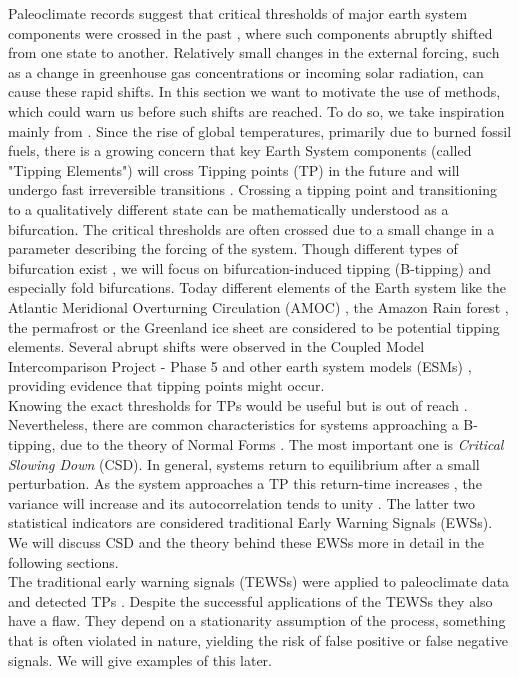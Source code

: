 \documentclass[%
thesis=student,%
coverpage=false,%
titlepage=false,%
headmarks=true, %
english,%
font=libertine, %
math=newpxtx, %
BCOR=5mm,%
coverBCOR=11mm%
]{tumbook}
\begin{document}
Paleoclimate records suggest that critical thresholds of major earth system components were crossed in the past \cite{Brovkin:2021}, where such components abruptly shifted from one state to another. Relatively small changes in the external forcing, such as a change in greenhouse gas concentrations or incoming solar radiation, can cause these rapid shifts. In this section we want to motivate the use of methods, which could warn us before such shifts are reached. To do so, we take inspiration mainly from \cite{Clarke:2023}.
Since the rise of global temperatures, primarily due to burned fossil fuels, there is a growing concern \cite{Lenton:2019,Steffen:2018,Ritchie:2021} that key Earth System components (called "Tipping Elements") will cross Tipping points (TP) in the future and will undergo fast irreversible transitions \cite{Lenton:2008}. 
Crossing a tipping point and transitioning to a qualitatively different state can be mathematically understood as a bifurcation. The critical thresholds are often crossed due to a small change in a parameter describing the forcing of the system. Though different types of bifurcation exist \cite{Ashwin:2012}, we will focus on bifurcation-induced tipping (B-tipping) and especially fold bifurcations. Today different elements of the Earth system like the Atlantic Meridional Overturning Circulation (AMOC) \cite{Stommel:1961}, the Amazon Rain forest \cite{Cox:2000}, the permafrost \cite{Steffen:2018} or the Greenland ice sheet \cite{Feldmann:2015} are considered to be potential tipping elements. Several abrupt shifts were observed in the Coupled Model Intercomparison Project - Phase 5 \cite{Taylor:2012} and other earth system models (ESMs) \cite{Drijfhout:2015}, providing evidence that tipping points might occur. \\
Knowing the exact thresholds for TPs would be useful but is out of reach \cite{Steffen:2018,Drijfhout:2015}. Nevertheless, there are common characteristics for systems approaching a B-tipping, due to the theory of Normal Forms \cite{Strogatz:2015,Guckenheimer:1983}. The most important one is \emph{Critical Slowing Down} (CSD). In general, systems return to equilibrium after a small perturbation. As the system approaches a TP this return-time increases \cite{Scheffer:2012}, the variance will increase and its autocorrelation tends to unity \cite{Scheffer:2009,Held:2004}. The latter two statistical indicators are considered traditional Early Warning Signals (EWSs). We will discuss CSD and the theory behind these EWSs more in detail in the following sections. \\
The traditional early warning signals (TEWSs) were applied to paleoclimate data and detected TPs \cite{Boers:2018}. Despite the successful applications of the TEWSs they also have a flaw. They depend on a stationarity assumption of the process, something that is often violated in nature, yielding the risk of false positive or false negative signals. We will give examples of this later. 
\end{document}
